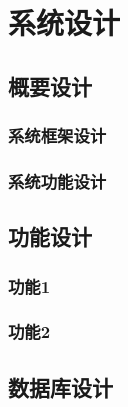 \documentclass[twoside,11pt]{article}
\begin{document}
\section{系统设计}
\subsection{概要设计}
\subsubsection{系统框架设计}
\subsubsection{系统功能设计}
\subsection{功能设计}
\subsubsection{功能1}
\subsubsection{功能2}
\subsection{数据库设计}
\end{document}
